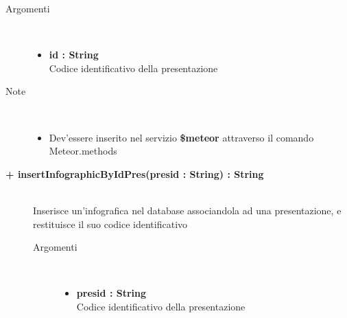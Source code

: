 \begin{description}
\begin{description}
		\begin{description}
			\item[Argomenti] \hfill \\
				\begin{itemize}
				
					\item \textbf{id : String			} \hfill \\
					Codice identificativo della presentazione
					
				\end{itemize}
			\item[Note] \hfill \\
			\begin{itemize}
					\item Dev'essere inserito nel servizio \textbf{\$meteor} attraverso il comando Meteor.methods
				\end{itemize}
		\end{description}
	\end{description}
	
	\begin{description}
		\item[\textbf{\color{blue}+  insertInfographicByIdPres(presid : String) : String			}] \hfill \\
			Inserisce un'infografica nel database associandola ad una presentazione, e restituisce il suo codice identificativo
			
		\begin{description}
			\item[Argomenti] \hfill \\
				\begin{itemize}
				
					\item \textbf{presid : String			} \hfill \\
					Codice identificativo della presentazione
					

\end{itemize}
\end{description}
\end{description}
\end{description}
